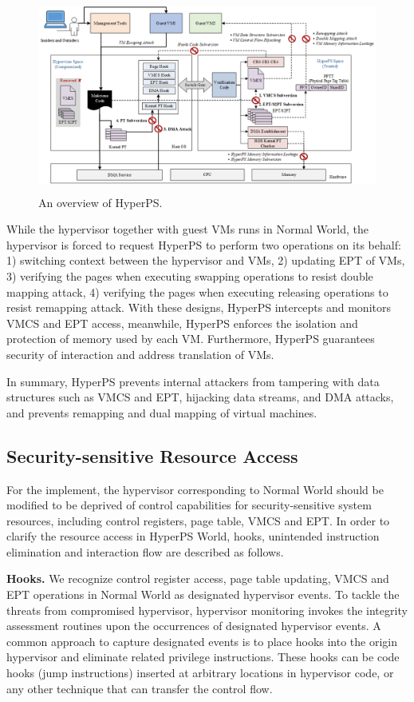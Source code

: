 \documentclass[10pt, numbers, preprint ]{sigplanconf}
\begin{document}
{\begin{figure}[htbp]
	\centerline{\includegraphics[height=2.50in]{figures/p3.png}}
	\caption{An overview of HyperPS.}
	\label{fg3_hyperps}
\end{figure}

While the hypervisor together with guest VMs runs in Normal World, the hypervisor is forced to request HyperPS to perform two operations on its behalf: 1) switching context between the hypervisor and VMs, 2) updating EPT of VMs, 3) verifying the pages when executing swapping operations to resist double mapping attack, 4) verifying the pages when executing releasing operations to resist remapping attack. With these designs, HyperPS intercepts and monitors VMCS and EPT access, meanwhile, HyperPS enforces the isolation and protection of memory used by each VM. Furthermore, HyperPS guarantees security of interaction and address translation of VMs.

In summary, HyperPS prevents internal attackers from tampering with data structures such as VMCS and EPT, hijacking data streams, and DMA attacks, and prevents remapping and dual mapping of virtual machines.

\subsection{Security-sensitive Resource Access} \label{subsec:secusra}
For the implement, the hypervisor corresponding to Normal World should be modified to be deprived of control capabilities for security-sensitive system resources, including control registers, page table, VMCS and EPT. In order to clarify the resource access in HyperPS World, hooks, unintended instruction elimination and interaction flow are described as follows.

\textbf{Hooks.} We recognize control register access, page table updating, VMCS and EPT operations in Normal World as designated hypervisor events. To tackle the threats from compromised hypervisor, hypervisor monitoring invokes the integrity assessment routines upon the occurrences of designated hypervisor events. A common approach to capture designated events is to place hooks into the origin hypervisor and eliminate related privilege instructions. These hooks can be code hooks (jump instructions) inserted at arbitrary locations in hypervisor code, or any other technique that can transfer the control flow.

}
\end{document}
